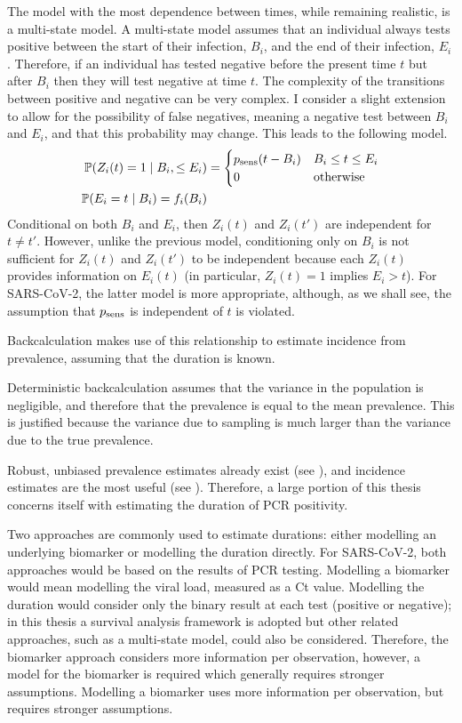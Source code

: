 \documentclass[thesis.tex]{subfiles}
\begin{document}
The model with the most dependence between times, while remaining realistic, is a multi-state model.
A multi-state model assumes that an individual always tests positive between the start of their infection, $B_i$, and the end of their infection, $E_i$.
Therefore, if an individual has tested negative before the present time $t$ but after $B_i$ then they will test negative at time $t$.
The complexity of the transitions between positive and negative can be very complex.
I consider a slight extension to allow for the possibility of false negatives, meaning a negative test between $B_i$ and $E_i$, and that this probability may change.
This leads to the following model.
\begin{align}
  \operatorname{\mathbb{P}}(Z_i(t) = 1 \mid B_i, \leq E_i) &= \begin{cases}
    p_\text{sens}(t - B_i) &B_i \leq t \leq E_i\\
    0 &\text{otherwise}
  \end{cases}\\
  \operatorname{\mathbb{P}}(E_i = t \mid B_i) = f_i(B_i)
\end{align}
Conditional on both $B_i$ and $E_i$, then $Z_i(t)$ and $Z_i(t')$ are independent for $t \neq t'$.
However, unlike the previous model, conditioning only on $B_i$ is not sufficient for $Z_i(t)$ and $Z_i(t')$ to be independent because each $Z_i(t)$ provides information on $E_i(t)$ (in particular, $Z_i(t) = 1$ implies $E_i > t$).
For SARS-CoV-2, the latter model is more appropriate, although, as we shall see, the assumption that $p_\text{sens}$ is independent of $t$ is violated.

Backcalculation makes use of this relationship to estimate incidence from prevalence, assuming that the duration is known.

Deterministic backcalculation assumes that the variance in the population is negligible, and therefore that the prevalence is equal to the mean prevalence.
This is justified because the variance due to sampling is much larger than the variance due to the true prevalence.

Robust, unbiased prevalence estimates already exist (see ), and incidence estimates are the most useful (see ).
Therefore, a large portion of this thesis concerns itself with estimating the duration of PCR positivity.

Two approaches are commonly used to estimate durations: either modelling an underlying biomarker or modelling the duration directly.
For SARS-CoV-2, both approaches would be based on the results of PCR testing.
Modelling a biomarker would mean modelling the viral load, measured as a Ct value.
Modelling the duration would consider only the binary result at each test (positive or negative); in this thesis a survival analysis framework is adopted but other related approaches, such as a multi-state model, could also be considered.
Therefore, the biomarker approach considers more information per observation, however, a model for the biomarker is required which generally requires stronger assumptions.
Modelling a biomarker uses more information per observation, but requires stronger assumptions.
\end{document}
